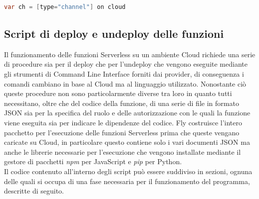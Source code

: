 \begin{lstlisting}[language=Java,caption={Dichiarazione di un \textit{Channel} su Cloud.}, label={lst:flyChannel}]
var ch = [type="channel"] on cloud
\end{lstlisting}

\subsection{Script di deploy e undeploy delle funzioni}
Il funzionamento delle funzioni Serverless su un ambiente Cloud richiede una serie di procedure sia per il deploy che per l'undeploy che vengono eseguite mediante gli strumenti di Command Line Interface forniti dai provider, di conseguenza i comandi cambiano in base al Cloud ma al linguaggio utilizzato. Nonostante ciò queste procedure non sono particolarmente diverse tra loro in quanto tutti necessitano, oltre che del codice della funzione, di una serie di file in formato JSON sia per la specifica del ruolo e delle autorizzazione con le quali la funzione viene eseguita sia per indicare le dipendenze del codice. Fly costruisce l'intero pacchetto per l'esecuzione delle funzioni Serverless prima che queste vengano caricate su Cloud, in particolare questo contiene solo i vari documenti JSON ma anche le librerie necessarie per l'esecuzione che vengono installate mediante il gestore di pacchetti \textit{npm} \cite{npm} per JavaScript e \textit{pip} \cite{pip} per Python.\\
Il codice contenuto all'interno degli script può essere suddiviso in sezioni, ognuna delle quali si occupa di una fase necessaria per il funzionamento del programma, descritte di seguito.

